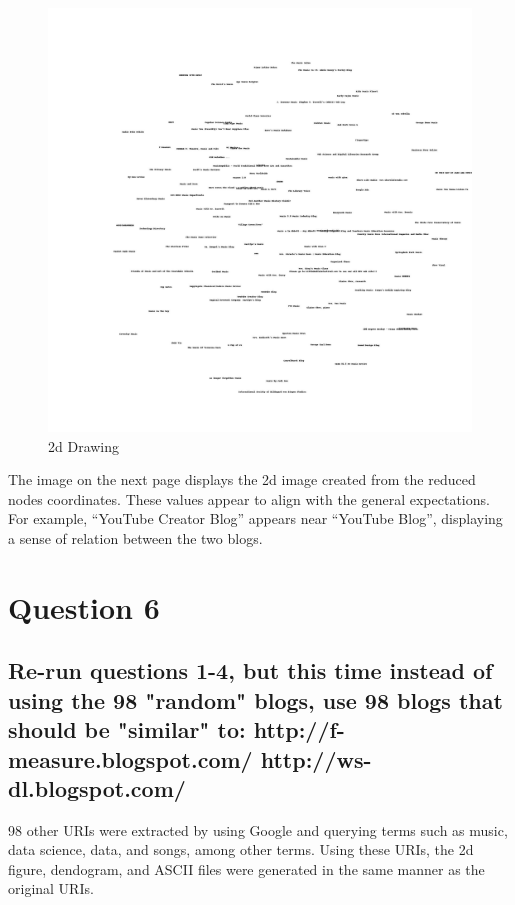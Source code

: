 \documentclass[11pt]{scrartcl} %
\begin{document}
\begin{figure}[p]%
        \includegraphics[width=.99\textwidth,height=.99\textheight]{../Figures/blogs2d.jpg}%
        \caption{2d Drawing}
    \end{figure}%

\bigskip \bigskip
\tabto{2.0cm} The image on the next page displays the 2d image created from the reduced nodes coordinates. These values appear to align with the general expectations. For example, ``YouTube Creator Blog'' appears near ``YouTube Blog'', displaying a sense of relation between the two blogs.

\pagebreak
\section*{Question 6}


\subsection*{Re-run questions 1-4, but this time instead of using the 98 
"random" blogs, use 98 blogs that should be "similar" to:
http://f-measure.blogspot.com/
http://ws-dl.blogspot.com/}

\tabto{2.0cm} 98 other URIs were extracted by using Google and querying terms such as music, data science, data, and songs, among other terms. Using these URIs, the 2d figure, dendogram, and ASCII files were generated in the same manner as the original URIs. \newline \newline
\end{document}
